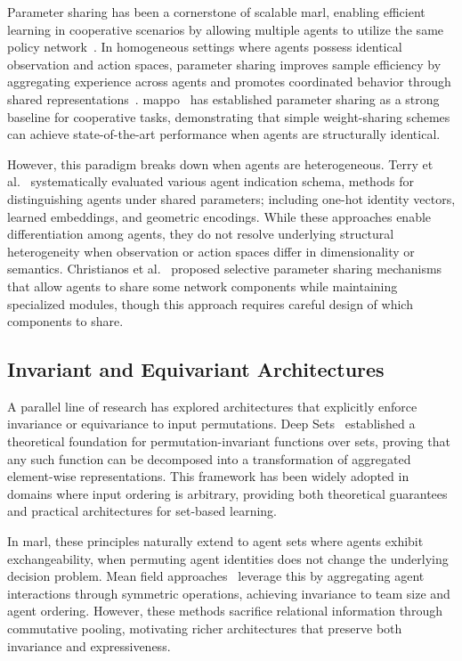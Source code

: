 Parameter sharing has been a cornerstone of scalable \gls{marl}, 
enabling efficient learning in cooperative scenarios by allowing 
multiple agents to utilize the same policy network~\cite{gupta2017, foerster2018}. 
In homogeneous settings where agents possess identical observation and action spaces, 
parameter sharing improves sample efficiency by aggregating experience across agents 
and promotes coordinated behavior through shared representations~\cite{terry2020}. 
\Gls{mappo}~\cite{yu2022} has established parameter sharing as a 
strong baseline for cooperative tasks, demonstrating that simple weight-sharing 
schemes can achieve state-of-the-art performance when agents are structurally identical.

However, this paradigm breaks down when agents are heterogeneous. 
Terry et al.~\cite{terry2020} systematically evaluated various agent indication schema, 
methods for distinguishing agents under shared parameters; 
including one-hot identity vectors, learned embeddings, and geometric encodings. 
While these approaches enable differentiation among agents, 
they do not resolve underlying structural heterogeneity when 
observation or action spaces differ in dimensionality or semantics. 
Christianos et al.~\cite{christianos2021} proposed selective parameter sharing 
mechanisms that allow agents to share some network components while 
maintaining specialized modules, though this approach requires careful 
design of which components to share.

\subsection{Invariant and Equivariant Architectures}

A parallel line of research has explored architectures that explicitly 
enforce invariance or equivariance to input permutations. 
Deep Sets~\cite{zaheer2017} established a theoretical foundation for 
permutation-invariant functions over sets, proving that any such function 
can be decomposed into a transformation of aggregated element-wise representations. 
This framework has been widely adopted in domains where input ordering is arbitrary, 
providing both theoretical guarantees and practical architectures for set-based learning.

In \gls{marl}, these principles naturally extend to agent sets where 
agents exhibit exchangeability, when permuting agent identities does 
not change the underlying decision problem. 
Mean field approaches~\cite{yang2018, li2021b} leverage this by 
aggregating agent interactions through symmetric operations, 
achieving invariance to team size and agent ordering. 
However, these methods sacrifice relational information through commutative pooling, 
motivating richer architectures that preserve both invariance and expressiveness.

